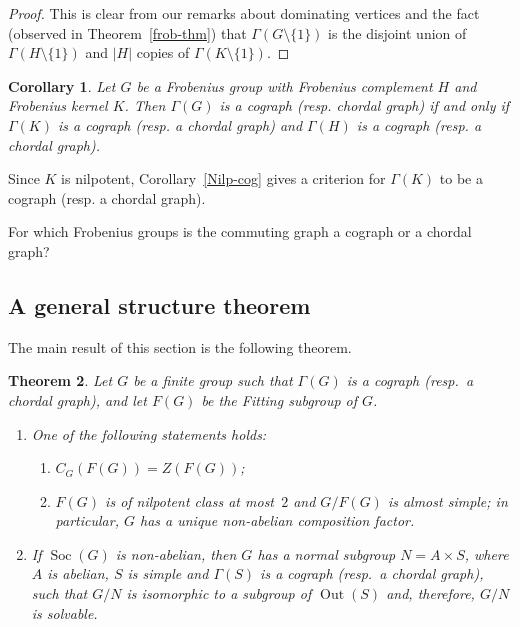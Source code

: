 \documentclass{elsarticle}
\newtheorem{theorem}{Theorem}[section]
\newtheorem{cor}[theorem]{Corollary}
\newcommand{\Soc}{\mathop{\mathrm{Soc}}}
\newcommand{\Out}{\mathop{\mathrm{Out}}}
\begin{document}
\begin{proof} This is clear from our remarks about dominating vertices and the
fact (observed in Theorem~\ref{frob-thm}) that $\Gamma(G\setminus\{1\})$ is the
disjoint union of $\Gamma(H\setminus\{1\})$ and $|H|$ copies of
$\Gamma(K\setminus\{1\})$.
\end{proof}

\begin{cor}  Let $G$ be a Frobenius group with Frobenius complement $H$ and Frobenius kernel $K$. Then $\Gamma(G)$ is a cograph {\rm(}resp. chordal graph{\rm)} if and only if $\Gamma(K)$ is a cograph {\rm(}resp. a chordal graph{\rm)} and $\Gamma(H)$ is a cograph {\rm(}resp. a chordal graph{\rm)}.
\end{cor}


\begin{remark}
Since $K$ is nilpotent, Corollary~{\rm \ref{Nilp-cog}} gives a criterion for
$\Gamma(K)$ to be a cograph {\rm(}resp. a chordal graph{\rm)}.
\end{remark}


\begin{ques} For which Frobenius groups is the commuting graph a cograph or a chordal graph?
\end{ques}


\subsection{A general structure theorem}\label{General}

The main result of this section is the following theorem.

\begin{theorem}\label{CommonStructure_Cograph}
Let $G$ be a finite group such that $\Gamma(G)$ is a cograph {\rm(}resp.\ a chordal graph{\rm)}, and let $F(G)$ be the Fitting subgroup of $G$.
\begin{enumerate}
\item One of the following statements holds:
  \begin{enumerate}
  \item $C_G(F(G))=Z(F(G))$;
  \item $F(G)$ is of nilpotent class at most~$2$ and $G/F(G)$ is almost simple;
in particular, $G$ has a unique non-abelian composition factor.
  \end{enumerate}
\item If $\Soc(G)$ is non-abelian, then $G$ has a normal subgroup $N=A \times S$, where $A$ is abelian, $S$ is simple and $\Gamma(S)$ is a cograph {\rm(}resp.\ a chordal graph{\rm)}, such that $G/N$ is isomorphic to a subgroup of $\Out(S)$ and, therefore, $G/N$ is solvable.
\end{enumerate}
\end{theorem}
\end{document}

